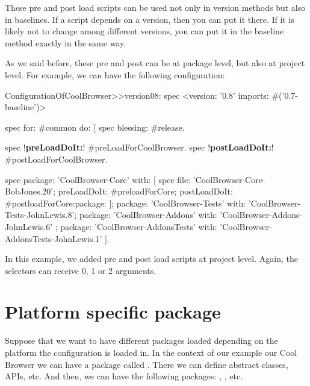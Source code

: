 \documentclass[a4paper,10pt,twoside]{book}
\begin{document}
These pre and post load scripts can be used not only in version methods but also in baselines. If a script depends on a version, then you can put it there. If it is likely not to change among different versions, you can put it in the baseline method exactly in the same way.

As we said before, these pre and post can be at package level, but also at project level. For example, we can have the following configuration:

\begin{code}{}
ConfigurationOfCoolBrowser>>version08: spec
       <version: '0.8' imports: #('0.7-baseline')>

       spec for: #common do: [
              spec blessing: #release.

              spec !\textbf{preLoadDoIt:}! #preLoadForCoolBrowser.
              spec !\textbf{postLoadDoIt:}! #postLoadForCoolBrowser.

              spec
                     package: 'CoolBrowser-Core' with: [
                            spec
                                   file: 'CoolBrowser-Core-BobJones.20';
                                   preLoadDoIt: #preloadForCore;
                                   postLoadDoIt: #postloadForCore:package: ];
                     package: 'CoolBrowser-Tests' with: 'CoolBrowser-Tests-JohnLewis.8';
                     package: 'CoolBrowser-Addons' with: 'CoolBrowser-Addons-JohnLewis.6' ;
                     package: 'CoolBrowser-AddonsTests' with: 'CoolBrowser-AddonsTests-JohnLewis.1' ].
\end{code}

In this example, we added pre and post load scripts at project level. Again, the selectors can receive 0, 1 or 2 arguments.


\section {Platform specific package}

Suppose that we want to have different packages loaded depending on the platform the configuration is loaded in. In the context of our example our Cool Browser we can have a package called . There we can define abstract classes, APIs, etc. And then, we can have the following packages: , , etc.
\end{document}
